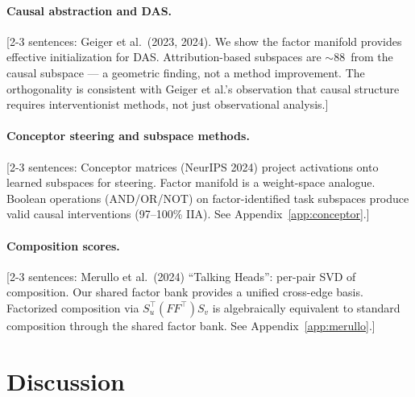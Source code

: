 \documentclass[11pt]{article}
\begin{document}

\paragraph{Causal abstraction and DAS.}
[2-3 sentences: Geiger et al.\ (2023, 2024). We show the factor
manifold provides effective initialization for DAS. Attribution-based
subspaces are $\sim$88\textdegree\ from the causal subspace --- a
geometric finding, not a method improvement. The orthogonality is
consistent with Geiger et al.'s observation that causal structure
requires interventionist methods, not just observational analysis.]

\paragraph{Conceptor steering and subspace methods.}
[2-3 sentences: Conceptor matrices (NeurIPS 2024) project activations
onto learned subspaces for steering. Factor manifold is a weight-space
analogue. Boolean operations (AND/OR/NOT) on factor-identified task
subspaces produce valid causal interventions (97--100\% IIA).
See Appendix~\ref{app:conceptor}.]

\paragraph{Composition scores.}
[2-3 sentences: Merullo et al.\ (2024) ``Talking Heads'': per-pair SVD
of composition. Our shared factor bank provides a unified cross-edge
basis. Factorized composition via $S_u^\top (F F^\top) S_v$ is
algebraically equivalent to standard composition through the shared
factor bank. See Appendix~\ref{app:merullo}.]



\section{Discussion}

\end{document}
